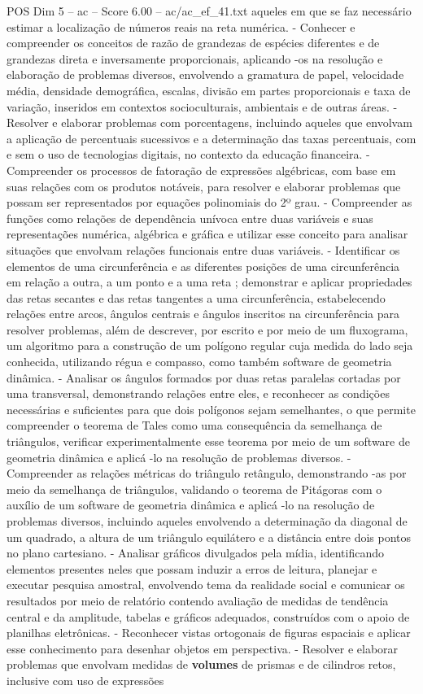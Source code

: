 \begin{textsample}{POS Dim 5 – ac – Score 6.00 – ac/ac\_ef\_41.txt}
aqueles em que se faz necessário estimar a localização de números reais na reta numérica. - Conhecer e compreender os conceitos de razão de grandezas de espécies diferentes e de grandezas direta e inversamente proporcionais, aplicando -os na resolução e elaboração de problemas diversos, envolvendo a gramatura de papel, velocidade média, densidade demográfica, escalas, divisão em partes proporcionais e taxa de variação, inseridos em contextos socioculturais, ambientais e de outras áreas. - Resolver e elaborar problemas com porcentagens, incluindo aqueles que envolvam a aplicação de percentuais sucessivos e a determinação das taxas percentuais, com e sem o uso de tecnologias digitais, no contexto da educação financeira. - Compreender os processos de fatoração de expressões algébricas, com base em suas relações com os produtos notáveis, para resolver e elaborar problemas que possam ser representados por equações polinomiais do 2º grau. - Compreender as funções como relações de dependência unívoca entre duas variáveis e suas representações numérica, algébrica e gráfica e utilizar esse conceito para analisar situações que envolvam relações funcionais entre duas variáveis. - Identificar os elementos de uma circunferência e as diferentes posições de uma circunferência em relação a outra, a um ponto e a uma reta ; demonstrar e aplicar propriedades das retas secantes e das retas tangentes a uma circunferência, estabelecendo relações entre arcos, ângulos centrais e ângulos inscritos na circunferência para resolver problemas, além de descrever, por escrito e por meio de um fluxograma, um algoritmo para a construção de um polígono regular cuja medida do lado seja conhecida, utilizando régua e compasso, como também software de geometria dinâmica. - Analisar os ângulos formados por duas retas paralelas cortadas por uma transversal, demonstrando relações entre eles, e reconhecer as condições necessárias e suficientes para que dois polígonos sejam semelhantes, o que permite compreender o teorema de Tales como uma consequência da semelhança de triângulos, verificar experimentalmente esse teorema por meio de um software de geometria dinâmica e aplicá -lo na resolução de problemas diversos. - Compreender as relações métricas do triângulo retângulo, demonstrando -as por meio da semelhança de triângulos, validando o teorema de Pitágoras com o auxílio de um software de geometria dinâmica e aplicá -lo na resolução de problemas diversos, incluindo aqueles envolvendo a determinação da diagonal de um quadrado, a altura de um triângulo equilátero e a distância entre dois pontos no plano cartesiano. - Analisar gráficos divulgados pela mídia, identificando elementos presentes neles que possam induzir a erros de leitura, planejar e executar pesquisa amostral, envolvendo tema da realidade social e comunicar os resultados por meio de relatório contendo avaliação de medidas de tendência central e da amplitude, tabelas e gráficos adequados, construídos com o apoio de planilhas eletrônicas. - Reconhecer vistas ortogonais de figuras espaciais e aplicar esse conhecimento para desenhar objetos em perspectiva. - Resolver e elaborar problemas que envolvam medidas de \textbf{volumes} de prismas e de cilindros retos, inclusive com uso de expressões 
\end{textsample}
